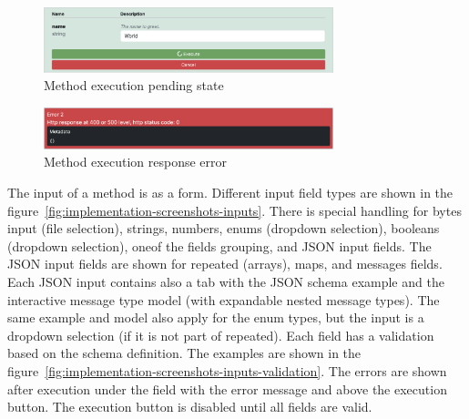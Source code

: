 \begin{figure}[!htb]
    \centering
    \captionsetup{justification=centering}
    \includegraphics[width=0.75\textwidth]{images/implementation/screenshots/execution-pending}
    \caption{Method execution pending state}
    \label{fig:implementation-screenshots-execution-pending}
\end{figure}

\begin{figure}[!htb]
    \centering
    \captionsetup{justification=centering}
    \includegraphics[width=0.75\textwidth]{images/implementation/screenshots/response-error}
    \caption{Method execution response error}
    \label{fig:implementation-screenshots-response-error}
\end{figure}

The input of a method is as a form.
Different input field types are shown in the figure~\ref{fig:implementation-screenshots-inputs}.
There is special handling for bytes input (file selection), strings, numbers, enums (dropdown selection), booleans (dropdown selection), oneof the fields grouping, and JSON input fields.
The JSON input fields are shown for repeated (arrays), maps, and messages fields.
Each JSON input contains also a tab with the JSON schema example and the interactive message type model (with expandable nested message types).
The same example and model also apply for the enum types, but the input is a dropdown selection (if it is not part of repeated).
Each field has a validation based on the schema definition.
The examples are shown in the figure~\ref{fig:implementation-screenshots-inputs-validation}.
The errors are shown after execution under the field with the error message and above the execution button.
The execution button is disabled until all fields are valid.

